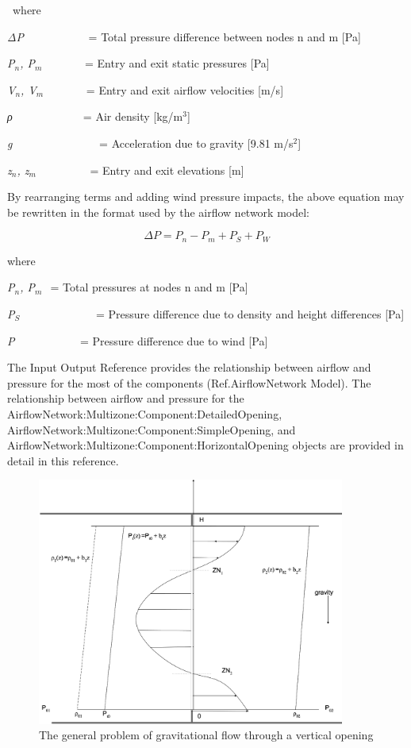 ~where

\emph{ΔP}~~~~~~~~~~~ = Total pressure difference between nodes n and m {[}Pa{]}

\emph{P\(_{n}\), P\(_{m}\)}~~~~~~~ = Entry and exit static pressures {[}Pa{]}

\emph{V\(_{n}\), V\(_{m}\)}~~~~~~~ = Entry and exit airflow velocities {[}m/s{]}

\emph{ρ~~~}~~~~~~~~~ = Air density {[}kg/m\(^{3}\){]}

\emph{g}~~~~~~~~~~~~~~~ = Acceleration due to gravity {[}9.81 m/s\(^{2}\){]}

\emph{z\(_{n}\), z\(_{m}\)}~~~~~~~~~ = Entry and exit elevations {[}m{]}

By rearranging terms and adding wind pressure impacts, the above equation may be rewritten in the format used by the airflow network model:

\begin{equation}
\Delta P = {P_n} - {P_m} + {P_S} + {P_W}
\end{equation}

where

\emph{P\(_{n}\), P\(_{m}\)} \(_{ }\) = Total pressures at nodes n and m {[}Pa{]}

\emph{P\(_{S}\)}~~~~~~~~~~~~~ = Pressure difference due to density and height differences {[}Pa{]}

\emph{P\(_{ }\)}~~~~~~~~~~~ = Pressure difference due to wind {[}Pa{]}

The Input Output Reference provides the relationship between airflow and pressure for the most of the components (Ref.AirflowNetwork Model). The relationship between airflow and pressure for the AirflowNetwork:Multizone:Component:DetailedOpening, AirflowNetwork:Multizone:Component:SimpleOpening, and AirflowNetwork:Multizone:Component:HorizontalOpening objects are provided in detail in this reference.

\begin{figure}[hbtp] %
\centering
\includegraphics[width=0.9\textwidth, height=0.9\textheight, keepaspectratio=true]{media/image2691.svg.png}
\caption{The general problem of gravitational flow through a vertical opening \protect \label{fig:the-general-problem-of-gravitational-flow}}
\end{figure}

